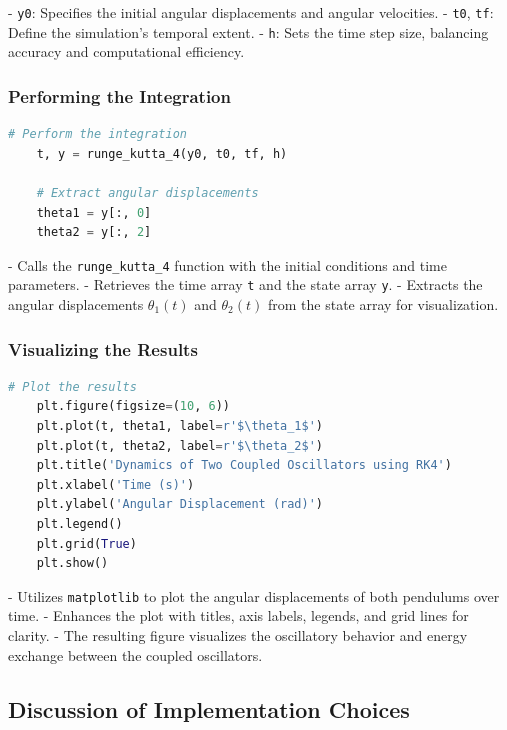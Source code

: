 \documentclass[12pt]{report} %
\begin{document}
    - \texttt{y0}: Specifies the initial angular displacements and angular velocities.
    - \texttt{t0}, \texttt{tf}: Define the simulation's temporal extent.
    - \texttt{h}: Sets the time step size, balancing accuracy and computational efficiency.
    
    \subsubsection{Performing the Integration}
    
    \begin{lstlisting}[language=Python, caption={Performing the Integration}, label={lst:perform_integration}]
    # Perform the integration
    t, y = runge_kutta_4(y0, t0, tf, h)
    
    # Extract angular displacements
    theta1 = y[:, 0]
    theta2 = y[:, 2]
    \end{lstlisting}
    
    - Calls the \texttt{runge\_kutta\_4} function with the initial conditions and time parameters.
    - Retrieves the time array \texttt{t} and the state array \texttt{y}.
    - Extracts the angular displacements \( \theta_1(t) \) and \( \theta_2(t) \) from the state array for visualization.
    
    \subsubsection{Visualizing the Results}
    
    \begin{lstlisting}[language=Python, caption={Plotting the Results}, label={lst:plot_results}]
    # Plot the results
    plt.figure(figsize=(10, 6))
    plt.plot(t, theta1, label=r'$\theta_1$')
    plt.plot(t, theta2, label=r'$\theta_2$')
    plt.title('Dynamics of Two Coupled Oscillators using RK4')
    plt.xlabel('Time (s)')
    plt.ylabel('Angular Displacement (rad)')
    plt.legend()
    plt.grid(True)
    plt.show()
    \end{lstlisting}
    
    - Utilizes \texttt{matplotlib} to plot the angular displacements of both pendulums over time.
    - Enhances the plot with titles, axis labels, legends, and grid lines for clarity.
    - The resulting figure visualizes the oscillatory behavior and energy exchange between the coupled oscillators.
    
    \subsection{Discussion of Implementation Choices}
    \label{subsec:part1_task2_discussion}
    
\end{document}
